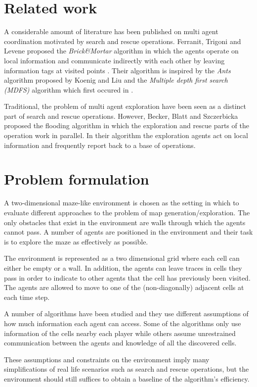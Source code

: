 \documentclass{article}
\begin{document}
\section{Related work}
A considerable amount of literature has been published on multi agent
coordination motivated by search and rescue operations. Ferranit, Trigoni and
Levene proposed the \textit{Brick\&Mortar} algorithm in which the agents operate
on local information and communicate indirectly with each other by leaving
information tags at visited points \cite{ferranti2007brick}. Their algorithm is
inspired by the \textit{Ants} algorithm proposed by Koenig and Liu \cite{koenig2001terrain} and the
\textit{Multiple depth first search (MDFS)} algorithm which first occured in \cite{tarry1895probleme}. 

Traditional, the problem of multi agent exploration have been seen as a
distinct part of search and rescue operations. However, Becker, Blatt and
Szczerbicka proposed the flooding algorithm \cite{becker2013multi} in which the
exploration and rescue parts of the operation work in parallel. In their
algorithm the exploration agents act on local information and frequently report
back to a base of operations.

\section{Problem formulation}
A two-dimensional maze-like environment is chosen as the setting in which to
evaluate different approaches to the problem of map generation/exploration.
The only obstacles that exist in the environment are walls through which the
agents cannot pass. A number of agents are positioned in the environment and
their task is to explore the maze as effectively as possible.

The environment is represented as a two dimensional grid where each cell can
either be empty or a wall. In addition, the agents can leave traces in cells
they pass in order to indicate to other agents that the cell has previously
been visited. The agents are allowed to move to one of the (non-diagonally)
adjacent cells at each time step. 

A number of algorithms have been studied and they use different assumptions of
how much information each agent can access. Some of the algorithms only use
information of the cells nearby each player while others assume unrestrained
communication between the agents and knowledge of all the discovered cells.

These assumptions and constraints on the environment imply many
simplifications of real life scenarios such as search and rescue operations,
but the environment should still suffices to obtain a baseline of the
algorithm's efficiency.
\end{document}
